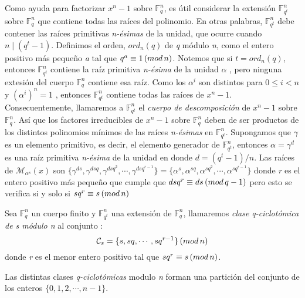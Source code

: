 Como ayuda para factorizar $x^n-1$ sobre $\mathbb{F}_q^n$, es útil considerar la extensión $\mathbb{F}_{q^t}^n$ sobre $\mathbb{F}_q^n$ que contiene todas las raíces del polinomio. En otras palabras, $\mathbb{F}_{q^t}^n$ debe contener las raíces primitivas \textit{n-ésimas} de la unidad, que ocurre cuando $ n \mid (q^t-1)$.  Definimos el orden, $ord_n(q)$ de \textit{q} módulo \textit{n}, como el entero positivo más pequeño \textit{a} tal que $q^a \equiv 1 \thinspace ( mod \thinspace n)$. Notemos que si $t = ord_n(q)$, entonces $\mathbb{F}_{q^t}^n$ contiene la raíz primitiva \textit{n-ésima} de la unidad $\alpha$ , pero ninguna extesión del cuerpo $\mathbb{F}_q^n$ contiene esa raíz. Como los $\alpha^i$ son distintos para $0 \leq i < n $ y $(\alpha^i)^n = 1$ , entonces $\mathbb{F}_{q^t}^n$ contiene todas las raíces de $x^n-1$. Consecuentemente, llamaremos a $\mathbb{F}_{q^t}^n$ el \textit{cuerpo de descomposición} de $x^n-1$ sobre $\mathbb{F}_q^n$. Así que los factores irreducibles de $x^n-1$ sobre $\mathbb{F}_q^n$ deben de ser productos de los distintos polinomios mínimos de las raíces \textit{n-ésimas} en $\mathbb{F}_{q^t}^n$.  Supongamos que $\gamma$ es un elemento primitivo, es decir, el elemento generador de $\mathbb{F}_{q^t}^n$, entonces $\alpha = \gamma^d$ es una raíz primitiva \textit{n-ésima} de la unidad en donde $d = (q^t-1)/n$. Las raíces de $\mathcal{M}_{\alpha^s}(x)$ son $\{ \gamma^{ds}, \gamma^{dsq},\gamma^{dsq^2} ,\cdots, \gamma^{dsq^{r-1}} \} = \{ \alpha^s,\alpha^{sq},\alpha^{sq^2},\cdots,\alpha^{sq^{r-1}} \}$ donde \textit{r} es el entero positivo más pequeño que cumple que $dsq^r \equiv ds \thinspace ( mod \thinspace q-1 )$ pero esto se verifica si y solo si $sq^r \equiv s \thinspace ( mod \thinspace n )$


\begin{definition}
Sea $\mathbb{F}_q^n$ un cuerpo finito y $\mathbb{F}_{q^t}^n$ una extensión de $\mathbb{F}_q^n$, llamaremos \textit{clase q-ciclotómica de s módulo n} al conjunto :
\[
	\mathcal{C}_s = \{s,sq,\cdots,sq^{r-1} \} \thinspace (mod \thinspace n)
\]
donde \textit{r} es el menor entero positivo tal que $sq^r \equiv s \thinspace (mod \thinspace n ) $.
\end{definition}

Las distintas clases \textit{q-ciclotómicas} modulo \textit{n} forman una partición del conjunto de los enteros $\{0,1,2,\cdots,n-1\}$.

